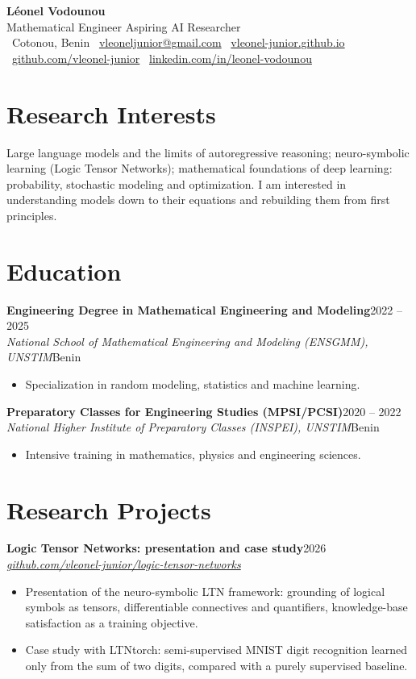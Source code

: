 \documentclass[10pt,a4paper]{article}
\newcommand{\entry}[4]{%
  \textbf{#1}\hfill{\color{muted}#2}\\
  \textit{#3}\hfill{\color{muted}\small #4}\par\vspace{2pt}}
\newcommand{\details}[1]{%
  \begin{itemize}[leftmargin=1.1em, label={\color{muted}\textbullet}, itemsep=1pt, topsep=1pt]
  #1
  \end{itemize}\vspace{5pt}}
\begin{document}
\begin{center}
  {\LARGE\bfseries Léonel Vodounou}\\[4pt]
  {\large Mathematical Engineer \textperiodcentered{} Aspiring AI Researcher}\\[6pt]
  \small
  \faMapMarker*\ Cotonou, Benin \quad
  \faEnvelope\ \href{mailto:vleoneljunior@gmail.com}{vleoneljunior@gmail.com} \quad
  \faGlobe\ \href{https://vleonel-junior.github.io}{vleonel-junior.github.io}\\[2pt]
  \faGithub\ \href{https://github.com/vleonel-junior}{github.com/vleonel-junior} \quad
  \faLinkedin\ \href{https://www.linkedin.com/in/leonel-vodounou}{linkedin.com/in/leonel-vodounou}
\end{center}

\section{Research Interests}
Large language models and the limits of autoregressive reasoning;
neuro-symbolic learning (Logic Tensor Networks);
mathematical foundations of deep learning: probability, stochastic modeling and optimization.
I am interested in understanding models down to their equations and rebuilding them from first principles.

\section{Education}
\entry{Engineering Degree in Mathematical Engineering and Modeling}{2022 -- 2025}
      {National School of Mathematical Engineering and Modeling (ENSGMM), UNSTIM}{Benin}
\details{\item Specialization in random modeling, statistics and machine learning.}

\entry{Preparatory Classes for Engineering Studies (MPSI/PCSI)}{2020 -- 2022}
      {National Higher Institute of Preparatory Classes (INSPEI), UNSTIM}{Benin}
\details{\item Intensive training in mathematics, physics and engineering sciences.}

\section{Research Projects}
\entry{Logic Tensor Networks: presentation and case study}{2026}
      {\href{https://github.com/vleonel-junior/logic-tensor-networks}{github.com/vleonel-junior/logic-tensor-networks}}{}
\details{
  \item Presentation of the neuro-symbolic LTN framework: grounding of logical symbols as tensors, differentiable connectives and quantifiers, knowledge-base satisfaction as a training objective.
  \item Case study with LTNtorch: semi-supervised MNIST digit recognition learned only from the sum of two digits, compared with a purely supervised baseline.
}
\end{document}
